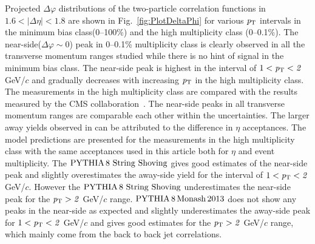 Projected $\Delta\varphi$ distributions of the two-particle correlation functions in $1.6<|\Delta\eta|<1.8$ are shown in Fig.~\ref{fig:PlotDeltaPhi} for various $\it{p}_{\rm{T}}$ intervals in the minimum bias class(0--100\%) and the high multiplicity class (0--0.1\%). The near-side($\Delta\varphi\sim 0$) peak in 0--0.1\% multiplicity class is clearly observed in all the transverse momentum ranges studied while there is no hint of signal in the minimum bias class. The near-side peak is highest in the interval of $1<\it{p}_{\rm{T}}<2$ GeV/$c$ and gradually decreases with increasing $\it{p}_{\rm{T}}$ in the high multiplicity class. The measurements in the high multiplicity class are compared with the results measured by the CMS collaboration~\cite{Khachatryan:2015lva}. The near-side peaks in all transverse momentum ranges are comparable each other within the uncertainties. The larger away yields observed in \cite{Khachatryan:2015lva} can be attributed to the difference in $\eta$ acceptances. The model predictions are presented for the measurements in the high multiplicity class with the same acceptances used in this article both for $\eta$ and event multiplicity. The $\mathrm{PYTHIA}\,8~\mathrm{String}~\mathrm{Shoving}$ gives good estimates of the near-side peak and slightly overestimates the away-side yield for the interval of $1<\it{p}_{\rm{T}}<2$ GeV/$c$. However the $\mathrm{PYTHIA}\,8~\mathrm{String}~\mathrm{Shoving}$ underestimates the near-side peak for the $\it{p}_{\rm{T}}>2$ GeV/$c$ range. $\mathrm{PYTHIA}\,8\,\mathrm{Monash}\,2013$ does not show any peaks in the near-side as expected and slightly underestimates the away-side peak for $1<\it{p}_{\rm{T}}<2$ GeV/$c$ and gives good estimates for the $\it{p}_{\rm{T}}>2$ GeV/$c$ range, which mainly come from the back to back jet correlations.



